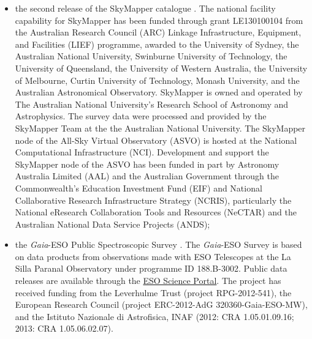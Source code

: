 \documentclass[longauth]{aa}
\newcommand\gaia{\textit{Gaia}\xspace}
\begin{document}
\begin{appendix}
\begin{itemize}
\item the second release of the SkyMapper catalogue \citep[SkyMapper DR2,][Digital Object Identifier 10.25914/5ce60d31ce759]{2019PASA...36...33O}. The national facility capability for SkyMapper has been funded through grant LE130100104 from the Australian Research Council (ARC) Linkage Infrastructure, Equipment, and Facilities (LIEF) programme, awarded to the University of Sydney, the Australian National University, Swinburne University of Technology, the University of Queensland, the University of Western Australia, the University of Melbourne, Curtin University of Technology, Monash University, and the Australian Astronomical Observatory. SkyMapper is owned and operated by The Australian National University's Research School of Astronomy and Astrophysics. The survey data were processed and provided by the SkyMapper Team at the the Australian National University. The SkyMapper node of the All-Sky Virtual Observatory (ASVO) is hosted at the National Computational Infrastructure (NCI). Development and support the SkyMapper node of the ASVO has been funded in part by Astronomy Australia Limited (AAL) and the Australian Government through the Commonwealth's Education Investment Fund (EIF) and National Collaborative Research Infrastructure Strategy (NCRIS), particularly the National eResearch Collaboration Tools and Resources (NeCTAR) and the Australian National Data Service Projects (ANDS);
\item the \gaia-ESO Public Spectroscopic Survey \citep[GES,][]{GES_final_release_paper_1,GES_final_release_paper_2}. The \gaia-ESO Survey is based on data products from observations made with ESO Telescopes at the La Silla Paranal Observatory under programme ID 188.B-3002. Public data releases are available through the \href{https://www.gaia-eso.eu/data-products/public-data-releases}{ESO Science Portal}. The project has received funding from the Leverhulme Trust (project RPG-2012-541), the European Research Council (project ERC-2012-AdG 320360-Gaia-ESO-MW), and the Istituto Nazionale di Astrofisica, INAF (2012: CRA 1.05.01.09.16; 2013: CRA 1.05.06.02.07).
\end{itemize}


\end{appendix}
\end{document}
